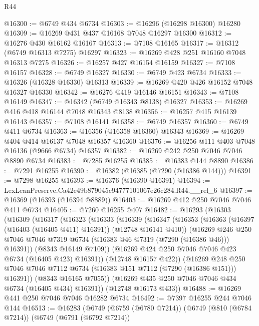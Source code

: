 \begin{lexlean}{R44}
\begin{coremodule}
{@16300 := @6749 @434 @6734
@16303 := @16296 (@16298 @16300) @16280
@16309 := @16269 @431 @437 @16168 @7048 @16297 @16300
@16312 := @16276 @430 @16162 @16167
@16313 := @7108 @16165
@16317 := @16312 (@6749 @16313 @7275) @16297
@16323 := @16269 @428 @251 @16160 @7048 @16313 @7275
@16326 := @16257 @427 @16154 @16159
@16327 := @7108 @16157
@16328 := @6749 @16327
@16330 := @6749 @423 @6734
@16333 := @16326 (@16328 @16330) @16313
@16339 := @16269 @420 @426 @16152 @7048 @16327 @16330
@16342 := @16276 @419 @16146 @16151
@16343 := @7108 @16149
@16347 := @16342 (@6749 @16343 @8138) @16327
@16353 := @16269 @416 @418 @16144 @7048 @16343 @8138
@16356 := @16257 @415 @16139 @16143
@16357 := @7108 @16141
@16358 := @6749 @16357
@16360 := @6749 @411 @6734
@16363 := @16356 (@16358 @16360) @16343
@16369 := @16269 @404 @414 @16137 @7048 @16357 @16360
@16376 := @16256 @111 @403 @7048 @16136 (@9666 @6734) @16357
@16382 := @16269 @242 @250 @7046 @7046 @8890 @6734
@16383 := @7285 @16255
@16385 := @16383 @144 @8890
@16386 := @7291 @16255
@16390 := @16382 (@16385 (@7290 (@16386 @144)))
@16391 := @7298 @16255
@16393 := @16376 (@16390 @16391)
@16394 := LexLeanPreserve.Ca42e49b879045c94777101067e26c284.R44.__rel_6
@16397 := @16369 (@16393 (@16394 @8889))
@16403 := @16269 @412 @250 @7046 @7046 @411 @6734
@16405 := @7260 @16255 @407
@16482 := @16293
    (@16303
      (@16309
        (@16317
          (@16323
            (@16333
              (@16339
                (@16347
                  (@16353
                    (@16363 (@16397 (@16403 (@16405 @411) @16391)) (@12748 @16141 @410))
                    (@16269
                      @246
                      @250
                      @7046
                      @7046
                      @7319
                      @6734
                      (@16383 @46 @7319 (@7290 (@16386 @46)))
                      @16391))
                  (@8343 @16149 @7109))
                (@16269 @424 @250 @7046 @7046 @423 @6734 (@16405 @423) @16391))
              (@12748 @16157 @422))
            (@16269
              @248
              @250
              @7046
              @7046
              @7112
              @6734
              (@16383 @151 @7112 (@7290 (@16386 @151)))
              @16391))
          (@8343 @16165 @7055))
        (@16269 @435 @250 @7046 @7046 @434 @6734 (@16405 @434) @16391))
      (@12748 @16173 @433))
@16488 := @16269 @441 @250 @7046 @7046 @16282 @6734
@16492 := @7397 @16255 @244 @7046 @144
@16513 := @16283
    (@6749
      (@6759 (@6780 @7214))
      (@6749
        (@810 (@6784 @7214))
        (@6749
          (@6791 (@6792 @7214))
}
\end{coremodule}
\end{lexlean}

